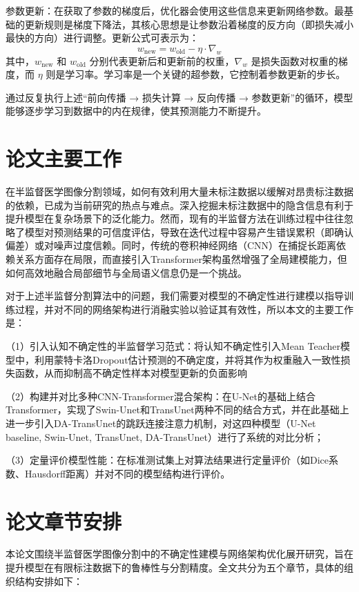 \documentclass[twoside,openright]{xduugthesis}
\begin{document}
参数更新：在获取了参数的梯度后，优化器会使用这些信息来更新网络参数。最基础的更新规则是梯度下降法，其核心思想是让参数沿着梯度的反方向（即损失减小最快的方向）进行调整。更新公式可表示为：
\begin{equation}
    w_{\text{new}} = w_{\text{old}} - \eta \cdot \nabla_w
\end{equation}
​
其中，$w_{\text{new}}$ 和 $w_{\text{old}}$ 分别代表更新后和更新前的权重，$\nabla_w$ 是损失函数对权重的梯度，而 $\eta$ 则是学习率。学习率是一个关键的超参数，它控制着参数更新的步长。

通过反复执行上述“前向传播 → 损失计算 → 反向传播 → 参数更新”的循环，模型能够逐步学习到数据中的内在规律，使其预测能力不断提升。

\section{论文主要工作}
在半监督医学图像分割领域，如何有效利用大量未标注数据以缓解对昂贵标注数据的依赖，已成为当前研究的热点与难点。深入挖掘未标注数据中的隐含信息有利于提升模型在复杂场景下的泛化能力。然而，现有的半监督方法在训练过程中往往忽略了模型对预测结果的可信度评估，导致在迭代过程中容易产生错误累积（即确认偏差）或对噪声过度信赖。同时，传统的卷积神经网络（CNN）在捕捉长距离依赖关系方面存在局限，而直接引入Transformer架构虽然增强了全局建模能力，但如何高效地融合局部细节与全局语义信息仍是一个挑战。

对于上述半监督分割算法中的问题，我们需要对模型的不确定性进行建模以指导训练过程，并对不同的网络架构进行消融实验以验证其有效性，所以本文的主要工作是： 

（1）引入认知不确定性的半监督学习范式：将认知不确定性引入Mean Teacher模型中，利用蒙特卡洛Dropout估计预测的不确定度，并将其作为权重融入一致性损失函数，从而抑制高不确定性样本对模型更新的负面影响

（2）构建并对比多种CNN-Transformer混合架构：在U-Net的基础上结合Transformer，实现了Swin-Unet和TransUnet两种不同的结合方式，并在此基础上进一步引入DA-TransUnet的跳跃连接注意力机制，对这四种模型（U-Net baseline, Swin-Unet, TransUnet, DA-TransUnet）进行了系统的对比分析；

（3）定量评价模型性能：在标准测试集上对算法结果进行定量评价（如Dice系数、Hausdorff距离）并对不同的模型结构进行评价。

\section{论文章节安排}
本论文围绕半监督医学图像分割中的不确定性建模与网络架构优化展开研究，旨在提升模型在有限标注数据下的鲁棒性与分割精度。全文共分为五个章节，具体的组织结构安排如下：
\end{document}
